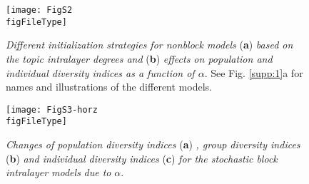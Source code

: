 \documentclass{svproc}
\def\figFileType{.eps}
\begin{document}
\begin{figure}[!ht]
    \centering
    \texttt{[image: FigS2\\figFileType]}
    \caption{
    \textit{Different initialization strategies for nonblock models} (\textbf{a})
    \textit{based on the topic intralayer degrees and }(\textbf{b})
    \textit{effects on population and individual diversity indices as a function of $\alpha$}.
    See Fig. \ref{supp:1}a for names and illustrations of the different models.
    }
    \label{supp:2}
\end{figure}

\begin{figure}[!ht]
    \centering
    \texttt{[image: FigS3-horz\\figFileType]}
    \caption{
    \textit{Changes of population diversity indices} (\textbf{a})
    \textit{, group diversity indices} (\textbf{b})
    \textit{and individual diversity indices} (\textbf{c})
    \textit{for the stochastic block intralayer models}
    \textit{due to} $\alpha$.
    }
    \label{supp:3}
\end{figure}
\end{document}
